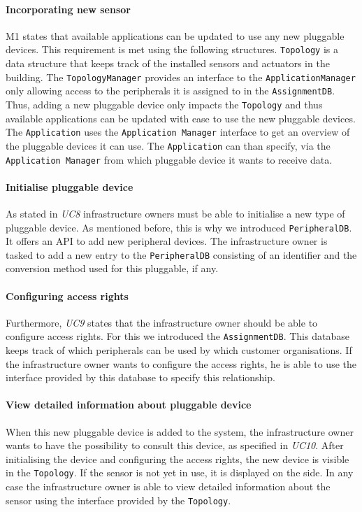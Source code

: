 \documentclass[english]{sareport}
\begin{document}
\paragraph{Incorporating new sensor}
M1 states that available applications can be updated to use any new pluggable devices. This requirement is met using the following structures. \texttt{Topology} is a data structure that keeps track of the installed sensors and actuators in the building. The \texttt{TopologyManager} provides an interface to the \texttt{ApplicationManager} only allowing access to the peripherals it is assigned to in the \texttt{AssignmentDB}. Thus, adding a new pluggable device only impacts the \texttt{Topology} and thus available applications can be updated with ease to use the new pluggable devices. The \texttt{Application} uses the \texttt{Application Manager} interface to get an overview of the pluggable devices it can use. The \texttt{Application} can than specify, via the \texttt{Application Manager} from which pluggable device it wants to receive data.

\paragraph{Initialise pluggable device}
As stated in \emph{UC8} infrastructure owners must be able to initialise a new type of pluggable device. As mentioned before, this is why we introduced \texttt{PeripheralDB}. It offers an API to add new peripheral devices. The infrastructure owner is tasked to add a new entry to the \texttt{PeripheralDB} consisting of an identifier and the conversion method used for this pluggable, if any.

\paragraph{Configuring access rights}
Furthermore, \emph{UC9} states that the infrastructure owner should be able to configure access rights. For this we introduced the \texttt{AssignmentDB}. This database keeps track of which peripherals can be used by which customer organisations. If the infrastructure owner wants to configure the access rights, he is able to use the interface provided by this database to specify this relationship.

\paragraph{View detailed information about pluggable device}
When this new pluggable device is added to the system, the infrastructure owner wants to have the possibility to consult this device, as specified in \emph{UC10}. After initialising the device and configuring the access rights, the new device is visible in the \texttt{Topology}. If the sensor is not yet in use, it is displayed on the side. In any case the infrastructure owner is able to view detailed information about the sensor using the interface provided by the \texttt{Topology}.
\end{document}
